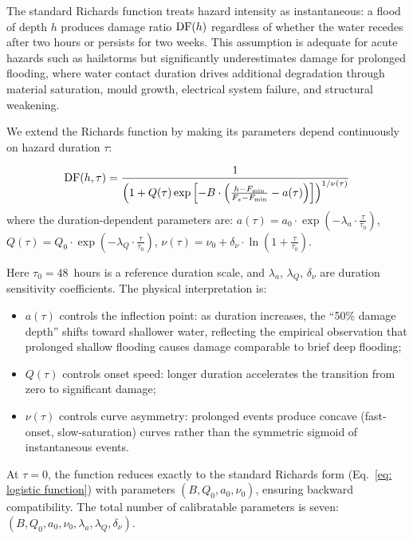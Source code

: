 The standard Richards function treats hazard intensity as instantaneous: a flood of depth $h$ produces damage ratio $\text{DF}(h)$ regardless of whether the water recedes after two hours or persists for two weeks. This assumption is adequate for acute hazards such as hailstorms but significantly underestimates damage for prolonged flooding, where water contact duration drives additional degradation through material saturation, mould growth, electrical system failure, and structural weakening.

We extend the Richards function by making its parameters depend continuously on hazard duration $\tau$:

\begin{equation}
    \text{DF}(h, \tau) = \frac{1}{\left(1 + Q(\tau) \exp\left[-B \cdot \left(\frac{h - F_{\min}}{F_s - F_{\min}} - a(\tau)\right)\right]\right)^{1/\nu(\tau)}}
    \label{eq: duration richards}
\end{equation}
where the duration-dependent parameters are:
    $a(\tau) = a_0 \cdot \exp\left(-\lambda_a \cdot \frac{\tau}{\tau_0}\right)$,
    $Q(\tau) = Q_0 \cdot \exp\left(-\lambda_Q \cdot \frac{\tau}{\tau_0}\right)$, 
    $\nu(\tau) = \nu_0 + \delta_\nu \cdot \ln\left(1 + \frac{\tau}{\tau_0}\right)$. 

Here $\tau_0 = 48$~hours is a reference duration scale, and $\lambda_a$, $\lambda_Q$, $\delta_\nu$ are duration sensitivity coefficients. The physical interpretation is:
\begin{itemize}
    \item $a(\tau)$ controls the inflection point: as duration increases, the ``50\% damage depth'' shifts toward shallower water, reflecting the empirical observation that prolonged shallow flooding causes damage comparable to brief deep flooding;
    \item $Q(\tau)$ controls onset speed: longer duration accelerates the transition from zero to significant damage;
    \item $\nu(\tau)$ controls curve asymmetry: prolonged events produce concave (fast-onset, slow-saturation) curves rather than the symmetric sigmoid of instantaneous events.
\end{itemize}

At $\tau = 0$, the function reduces exactly to the standard Richards form (Eq.~\ref{eq: logistic function}) with parameters $(B, Q_0, a_0, \nu_0)$, ensuring backward compatibility. The total number of calibratable parameters is seven: $(B, Q_0, a_0, \nu_0, \lambda_a, \lambda_Q, \delta_\nu)$.

